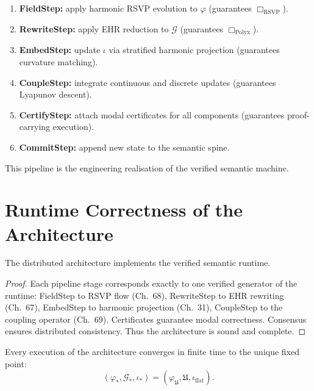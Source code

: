 \begin{enumerate}
\item \textbf{FieldStep:}  
      apply harmonic RSVP evolution to $\varphi$
      (guarantees $\Box_{\mathrm{RSVP}}$).

\item \textbf{RewriteStep:}  
      apply EHR reduction to $\mathcal{G}$
      (guarantees $\Box_{\mathrm{Polyx}}$).

\item \textbf{EmbedStep:}  
      update $\iota$ via stratified harmonic projection
      (guarantees curvature matching).

\item \textbf{CoupleStep:}  
      integrate continuous and discrete updates
      (guarantees Lyapunov descent).

\item \textbf{CertifyStep:}  
      attach modal certificates for all components
      (guarantees proof-carrying execution).

\item \textbf{CommitStep:}  
      append new state to the semantic spine.
\end{enumerate}

This pipeline is the engineering realisation of the verified semantic machine.

\section{Runtime Correctness of the Architecture}

\begin{theorem}
The distributed architecture implements the verified semantic runtime.
\end{theorem}

\begin{proof}
Each pipeline stage corresponds exactly to one verified generator of the runtime:  
FieldStep to RSVP flow (Ch.~68), RewriteStep to EHR rewriting (Ch.~67), 
EmbedStep to harmonic projection (Ch.~31), CoupleStep to the coupling operator 
(Ch.~69).  
Certificates guarantee modal correctness.  
Consensus ensures distributed consistency.  
Thus the architecture is sound and complete.
\end{proof}

\begin{corollary}
Every execution of the architecture converges in finite time to the unique fixed 
point:
\[
(\varphi_\ast,\mathcal{G}_\ast,\iota_\ast)
  = (\varphi_{\mathfrak{U}},\mathfrak{U},\iota_{\mathrm{flat}}).
\]
\end{corollary}

